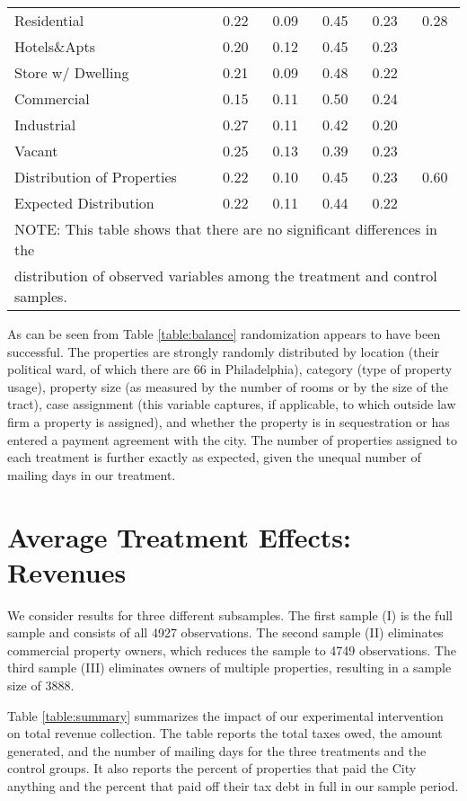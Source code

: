 \documentclass[12pt,titlepage]{article}
\begin{document}
\begin{table}[ht]
\begin{tabular}{|l|c|c|c|c|c|}
Residential & 0.22 & 0.09 & 0.45 & 0.23 & 0.28 \\ 
  Hotels\&Apts & 0.20 & 0.12 & 0.45 & 0.23 &  \\ 
  Store w/ Dwelling & 0.21 & 0.09 & 0.48 & 0.22 &  \\ 
  Commercial & 0.15 & 0.11 & 0.50 & 0.24 &  \\ 
  Industrial & 0.27 & 0.11 & 0.42 & 0.20 &  \\ 
  Vacant & 0.25 & 0.13 & 0.39 & 0.23 &  \\ 
   \hline
Distribution of Properties & 0.22 & 0.10 & 0.45 & 0.23 & 0.60 \\ 
   \hline
Expected Distribution & 0.22 & 0.11 & 0.44 & 0.22 &  \\ 
   \hline
\multicolumn{6}{|l|}{NOTE: This table shows that there are no significant differences in the} \\
\multicolumn{6}{|l|}{distribution of observed variables among the treatment and control samples.} \\ 
\hline
\end{tabular}
\end{table}


As can be seen from Table \ref{table:balance} randomization appears to
have been successful.  The properties are strongly randomly
distributed by location (their political ward, of which there are 66
in Philadelphia), category (type of property usage), property size (as
measured by the number of rooms or by the size of the tract), case
assignment (this variable captures, if applicable, to which outside
law firm a property is assigned), and whether the property is in
sequestration or has entered a payment agreement with the city. The
number of properties assigned to each treatment is further exactly as
expected, given the unequal number of mailing days in our treatment.


\section{Average Treatment Effects: Revenues}


We consider results for three different subsamples.  The first sample
(I) is the full sample and consists of all 4927 observations. The
second sample (II) eliminates commercial property owners, which
reduces the sample to 4749 observations. The third sample (III)
eliminates owners of multiple properties, resulting in a sample size
of 3888.

Table \ref{table:summary} summarizes the impact of our experimental
intervention on total revenue collection.  The table reports the total
taxes owed, the amount generated, and the number of mailing days for
the three treatments and the control groups. It also reports the
percent of properties that paid the City anything and the percent that
paid off their tax debt in full in our sample period.
\end{document}
